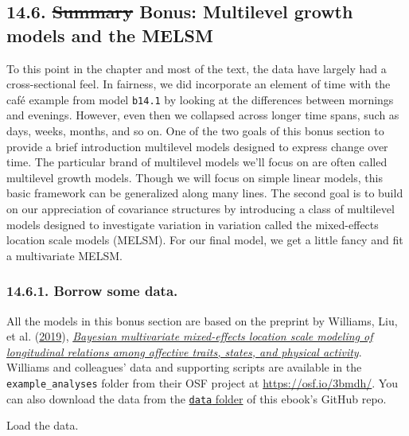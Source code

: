 \documentclass[]{article}
\begin{document}
\hypertarget{summary-bonus-multilevel-growth-models-and-the-melsm}{%
\subsection{\texorpdfstring{14.6. \sout{Summary} Bonus: Multilevel
growth models and the
MELSM}{14.6. Summary Bonus: Multilevel growth models and the MELSM}}\label{summary-bonus-multilevel-growth-models-and-the-melsm}}

To this point in the chapter and most of the text, the data have largely
had a cross-sectional feel. In fairness, we did incorporate an element
of time with the café example from model \texttt{b14.1} by looking at
the differences between mornings and evenings. However, even then we
collapsed across longer time spans, such as days, weeks, months, and so
on. One of the two goals of this bonus section to provide a brief
introduction multilevel models designed to express change over time. The
particular brand of multilevel models we'll focus on are often called
multilevel growth models. Though we will focus on simple linear models,
this basic framework can be generalized along many lines. The second
goal is to build on our appreciation of covariance structures by
introducing a class of multilevel models designed to investigate
variation in variation called the mixed-effects location scale models
(MELSM). For our final model, we get a little fancy and fit a
multivariate MELSM.

\hypertarget{borrow-some-data.}{%
\subsubsection{14.6.1. Borrow some data.}\label{borrow-some-data.}}

All the models in this bonus section are based on the preprint by
Williams, Liu, et al.
(\protect\hyperlink{ref-williamsBayesianMultivariateMixedeffects2019a}{2019}),
\href{https://psyarxiv.com/4kfjp}{\emph{Bayesian multivariate
mixed-effects location scale modeling of longitudinal relations among
affective traits, states, and physical activity}}. Williams and
colleagues' data and supporting scripts are available in the
\texttt{example\_analyses} folder from their OSF project at
\url{https://osf.io/3bmdh/}. You can also download the data from the
\href{https://github.com/ASKurz/Statistical_Rethinking_with_brms_ggplot2_and_the_tidyverse_2_ed/tree/master/data}{\texttt{data}
folder} of this ebook's GitHub repo.

Load the data.
\end{document}
